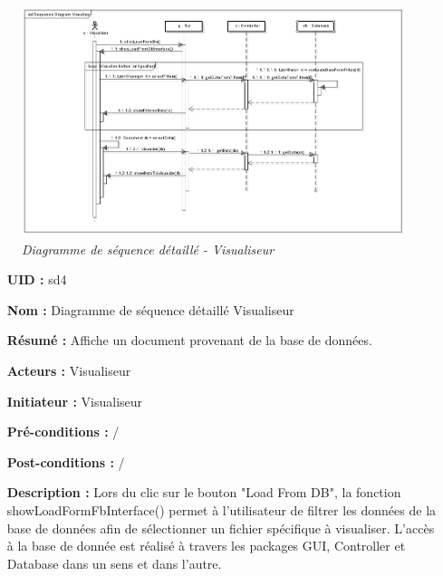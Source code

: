 \begin{figure}[!h]
	\begin{center}
		\includegraphics[scale = 0.6]{img/SeqDiagVisualizerDetailled.png}
	\end{center}
	\caption{\it Diagramme de séquence détaillé - Visualiseur}
	\label{seqDiagVisuDet}
\end{figure}

\newpage
\bigbreak

\begin{itemize}
	\item[{\bf UID :}] sd4
	\item[{\bf Nom :}] Diagramme de séquence détaillé Visualiseur
	\item[{\bf Résumé :}] Affiche un document provenant de la base de données.
	\item[{\bf Acteurs :}] Visualiseur
	\item[{\bf Initiateur :}] Visualiseur
	\item[{\bf Pré-conditions :}]  /
	\item[{\bf Post-conditions :}]  /
		\smallbreak
	\item[{\bf Description :}]
	Lors du clic sur le bouton "Load From DB", la fonction showLoadFormFbInterface() permet à l'utilisateur de filtrer les données de la base de données afin de sélectionner un fichier spécifique à visualiser. L'accès à la base de donnée est réalisé à travers les packages GUI, Controller et Database dans un sens et dans l'autre.
\end{itemize}

\bigbreak

